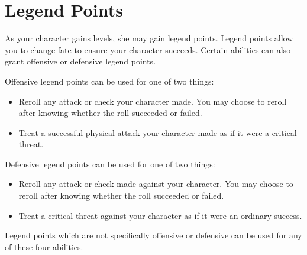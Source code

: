 \section{Legend Points}\label{Legend Points}

As your character gains levels, she may gain legend points. Legend points allow you to change fate to ensure your character succeeds. Certain abilities can also grant offensive or defensive legend points.

Offensive legend points can be used for one of two things:
\begin{itemize}
    \item Reroll any attack or check your character made. You may choose to reroll after knowing whether the roll succeeded or failed.
    \item Treat a successful physical attack your character made as if it were a critical threat.
\end{itemize}

Defensive legend points can be used for one of two things:
\begin{itemize}
    \item Reroll any attack or check made against your character. You may choose to reroll after knowing whether the roll succeeded or failed.
    \item Treat a critical threat against your character as if it were an ordinary success.
\end{itemize}

Legend points which are not specifically offensive or defensive can be used for any of these four abilities.
